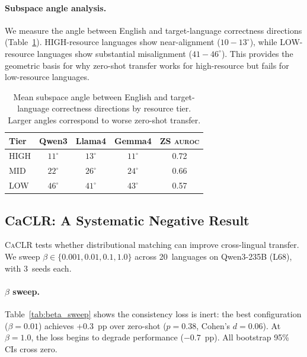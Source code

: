 \documentclass[11pt,a4paper]{article}
\newcommand{\aur}{\textsc{auroc}}
\newcommand{\caclr}{\textsc{CaCLR}}
\begin{document}
\paragraph{Subspace angle analysis.}
We measure the angle between English and target-language correctness directions (Table~\ref{tab:subspace}). HIGH-resource languages show near-alignment ($10{-}13^\circ$), while LOW-resource languages show substantial misalignment ($41{-}46^\circ$). This provides the geometric basis for why zero-shot transfer works for high-resource but fails for low-resource languages.

\begin{table}[t]
\centering
\small
\begin{tabular}{lcccc}
\toprule
\textbf{Tier} & \textbf{Qwen3} & \textbf{Llama4} & \textbf{Gemma4} & \textbf{ZS \aur{}} \\
\midrule
HIGH & $11^\circ$ & $13^\circ$ & $11^\circ$ & 0.72 \\
MID  & $22^\circ$ & $26^\circ$ & $24^\circ$ & 0.66 \\
LOW  & $46^\circ$ & $41^\circ$ & $43^\circ$ & 0.57 \\
\bottomrule
\end{tabular}
\caption{Mean subspace angle between English and target-language correctness directions by resource tier. Larger angles correspond to worse zero-shot transfer.}
\label{tab:subspace}
\end{table}

\subsection{CaCLR: A Systematic Negative Result}
\label{sec:caclr}

\caclr{} tests whether distributional matching can improve cross-lingual transfer. We sweep $\beta \in \{0.001, 0.01, 0.1, 1.0\}$ across 20~languages on Qwen3-235B (L68), with 3~seeds each.

\paragraph{$\beta$ sweep.} Table~\ref{tab:beta_sweep} shows the consistency loss is inert: the best configuration ($\beta=0.01$) achieves +0.3~pp over zero-shot ($p=0.38$, Cohen's $d=0.06$). At $\beta=1.0$, the loss begins to degrade performance ($-0.7$~pp). All bootstrap 95\% CIs cross zero.
\end{document}
